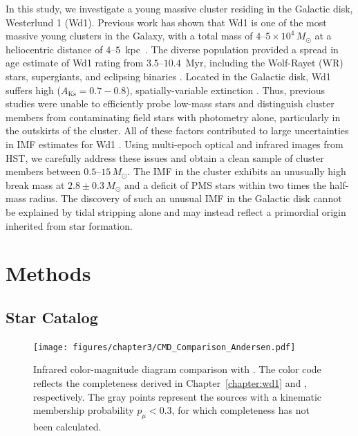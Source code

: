 \documentclass[12pt]{ucsddissertation}
\begin{document}
\begin{CJK*}{UTF8}{gbsn}
In this study, we investigate a young massive cluster residing in the Galactic disk, Westerlund 1 (Wd1). Previous work has shown that Wd1 is one of the most massive young clusters in the Galaxy, with a total mass of $4$--$5\times10^4\,M_\odot$ at a heliocentric distance of $4$--$5$~kpc~\cite{Clark-2005, Kothes-2007, Gennaro-2011, Andersen-2017}. The diverse population provided a spread in age estimate of Wd1 rating from $3.5$--$10.4$~Myr, including the Wolf-Rayet (WR) stars, supergiants, and eclipsing binaries \citep[][]{Clark-2005, Crowther-2006, Negueruela-2010, Beasor-2021, Navarete-2022, Rocha-2022}. Located in the Galactic disk, Wd1 suffers high ($A_\mathrm{Ks}=0.7-0.8$), spatially-variable extinction \cite{Damineli-2016, Hosek-2018}. Thus, previous studies were unable to efficiently probe low-mass stars and distinguish cluster members from contaminating field stars with photometry alone, particularly in the outskirts of the cluster. All of these factors contributed to large uncertainties in IMF estimates for Wd1 \cite{Brandner-2008, Gennaro-2011, Lim-2013, Andersen-2017}. Using multi-epoch optical and infrared images from HST, we carefully address these issues and obtain a clean sample of cluster members between $0.5$--$15\,M_\odot$. The IMF in the cluster exhibits an unusually high break mass at $2.8\pm0.3\,M_\odot$ and a deficit of PMS stars within two times the half-mass radius. The discovery of such an unusual IMF in the Galactic disk cannot be explained by tidal stripping alone and may instead reflect a primordial origin inherited from star formation.



\section{Methods}
\label{imf-sec:methods}

\subsection{Star Catalog}
\begin{figure}[htb!]
    \centering
    \texttt{[image: figures/chapter3/CMD\_Comparison\_Andersen.pdf]}
    \caption[Infrared color-magnitude diagram comparison]{Infrared color-magnitude diagram comparison with \citet{Andersen-2017}. The color code reflects the completeness derived in Chapter~\ref{chapter:wd1} and \citet{Andersen-2017}, respectively. The gray points represent the sources with a kinematic membership probability $p_\mu < 0.3$, for which completeness has not been calculated.}
    \label{fig:cmd_comparison}
\end{figure}


\end{CJK*}
\end{document}

